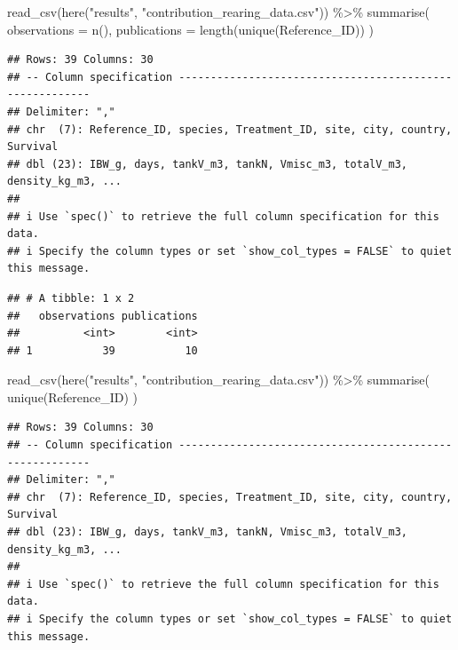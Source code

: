 \documentclass[
]{article}
\newenvironment{Shaded}{\begin{snugshade}}{\end{snugshade}}
\newcommand{\AttributeTok}[1]{\textcolor[rgb]{0.77,0.63,0.00}{#1}}
\newcommand{\FunctionTok}[1]{\textcolor[rgb]{0.00,0.00,0.00}{#1}}
\newcommand{\NormalTok}[1]{#1}
\newcommand{\SpecialCharTok}[1]{\textcolor[rgb]{0.00,0.00,0.00}{#1}}
\newcommand{\StringTok}[1]{\textcolor[rgb]{0.31,0.60,0.02}{#1}}
\begin{document}
\begin{Shaded}
\begin{Highlighting}[]
\FunctionTok{read\_csv}\NormalTok{(}\FunctionTok{here}\NormalTok{(}\StringTok{"results"}\NormalTok{, }\StringTok{"contribution\_rearing\_data.csv"}\NormalTok{)) }\SpecialCharTok{\%\textgreater{}\%} 
  \FunctionTok{summarise}\NormalTok{(}
    \AttributeTok{observations =} \FunctionTok{n}\NormalTok{(),}
    \AttributeTok{publications =} \FunctionTok{length}\NormalTok{(}\FunctionTok{unique}\NormalTok{(Reference\_ID))}
\NormalTok{  )}
\end{Highlighting}
\end{Shaded}

\begin{verbatim}
## Rows: 39 Columns: 30
## -- Column specification --------------------------------------------------------
## Delimiter: ","
## chr  (7): Reference_ID, species, Treatment_ID, site, city, country, Survival
## dbl (23): IBW_g, days, tankV_m3, tankN, Vmisc_m3, totalV_m3, density_kg_m3, ...
## 
## i Use `spec()` to retrieve the full column specification for this data.
## i Specify the column types or set `show_col_types = FALSE` to quiet this message.
\end{verbatim}

\begin{verbatim}
## # A tibble: 1 x 2
##   observations publications
##          <int>        <int>
## 1           39           10
\end{verbatim}

\begin{Shaded}
\begin{Highlighting}[]
\FunctionTok{read\_csv}\NormalTok{(}\FunctionTok{here}\NormalTok{(}\StringTok{"results"}\NormalTok{, }\StringTok{"contribution\_rearing\_data.csv"}\NormalTok{)) }\SpecialCharTok{\%\textgreater{}\%} 
  \FunctionTok{summarise}\NormalTok{(}
    \FunctionTok{unique}\NormalTok{(Reference\_ID)}
\NormalTok{  )}
\end{Highlighting}
\end{Shaded}

\begin{verbatim}
## Rows: 39 Columns: 30
## -- Column specification --------------------------------------------------------
## Delimiter: ","
## chr  (7): Reference_ID, species, Treatment_ID, site, city, country, Survival
## dbl (23): IBW_g, days, tankV_m3, tankN, Vmisc_m3, totalV_m3, density_kg_m3, ...
## 
## i Use `spec()` to retrieve the full column specification for this data.
## i Specify the column types or set `show_col_types = FALSE` to quiet this message.
\end{verbatim}
\end{document}
